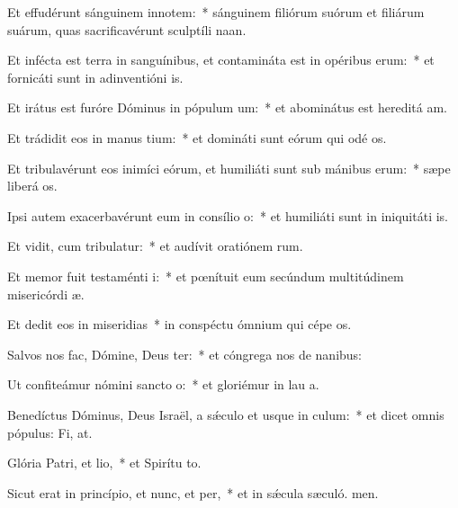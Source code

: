 \item Et effudérunt sánguinem innotem:~* sánguinem filiórum suórum et filiárum suárum, quas sacrificavérunt sculptíli naan.
\item Et infécta est terra in sanguínibus, et contamináta est in opéribus erum:~* et fornicáti sunt in adinventióni is.
\item Et irátus est furóre Dóminus in pópulum um:~* et abominátus est hereditá am.
\item Et trádidit eos in manus tium:~* et domináti sunt eórum qui odé os.
\item Et tribulavérunt eos inimíci eórum, et humiliáti sunt sub mánibus erum:~* sæpe liberá os.
\item Ipsi autem exacerbavérunt eum in consílio o:~* et humiliáti sunt in iniquitáti is.
\item Et vidit, cum tribulatur:~* et audívit oratiónem rum.
\item Et memor fuit testaménti i:~* et pœnítuit eum secúndum multitúdinem misericórdi æ.
\item Et dedit eos in miseridias~* in conspéctu ómnium qui cépe os.
\item Salvos nos fac, Dómine, Deus ter:~* et cóngrega nos de nanibus:
\item Ut confiteámur nómini sancto o:~* et gloriémur in lau a.
\item Benedíctus Dóminus, Deus Israël, a sǽculo et usque in culum:~* et dicet omnis pópulus: Fi, at.
\item Glória Patri, et lio,~* et Spirítu to.
\item Sicut erat in princípio, et nunc, et per,~* et in sǽcula sæculó. men.
